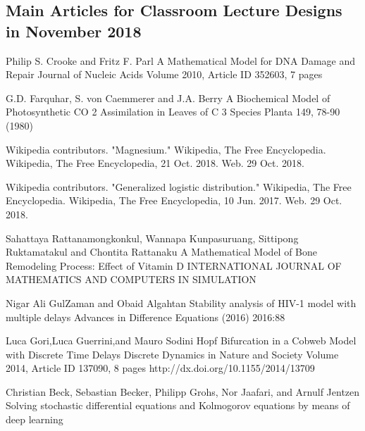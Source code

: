 

\begin{thebibliography}{00}
\small
\section{Main Articles for Classroom Lecture Designs in November 2018}
 
Philip S. Crooke and Fritz F. Parl
\newblock A Mathematical Model for DNA Damage and Repair
\newblock Journal of Nucleic Acids Volume 2010, Article ID 352603, 7 pages

 G.D. Farquhar, S. von Caemmerer and J.A. Berry  
\newblock A Biochemical Model of Photosynthetic CO 2 Assimilation in Leaves of C 3 Species 
\newblock Planta 149, 78-90 (1980) 

 Wikipedia contributors. 
\newblock "Magnesium." 
\newblock Wikipedia, The Free Encyclopedia. Wikipedia, The Free Encyclopedia, 21 Oct. 2018. Web. 29 Oct. 2018. 

Wikipedia contributors. 
\newblock "Generalized logistic distribution." 
\newblock Wikipedia, The Free Encyclopedia. Wikipedia, The Free Encyclopedia, 10 Jun. 2017. Web. 29 Oct. 2018. 

Sahattaya Rattanamongkonkul,  Wannapa Kunpasuruang, Sittipong Ruktamatakul and Chontita Rattanaku
\newblock A Mathematical Model of Bone Remodeling Process:  Effect of Vitamin D
\newblock INTERNATIONAL JOURNAL OF MATHEMATICS AND COMPUTERS IN SIMULATION

Nigar Ali GulZaman and Obaid Algahtan
\newblock Stability analysis of HIV-1 model with multiple delays
\newblock Advances in Difference Equations (2016) 2016:88 

 Luca Gori,Luca Guerrini,and Mauro Sodini
\newblock Hopf Bifurcation in a Cobweb Model with Discrete Time Delays
\newblock Discrete Dynamics in Nature and Society Volume 2014, Article ID 137090, 8 pages http://dx.doi.org/10.1155/2014/13709

 Christian Beck, Sebastian Becker, Philipp Grohs, Nor Jaafari, and Arnulf Jentzen
\newblock Solving stochastic differential equations and Kolmogorov equations by means of deep learning


\end{thebibliography}
